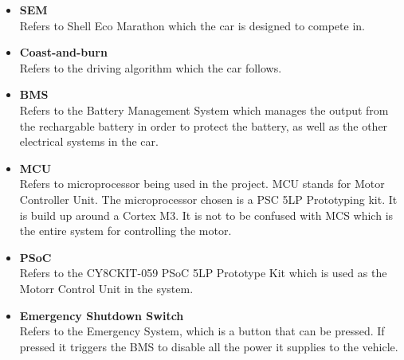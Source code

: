 \begin{itemize}
	\item \textbf{SEM}\\
	Refers to Shell Eco Marathon which the car is designed to compete in.
	\item \textbf{Coast-and-burn}\\
	Refers to the driving algorithm which the car follows.
	\item \textbf{BMS}\\
	Refers to the Battery Management System which manages the output from the rechargable battery in order to protect the battery, as well as the other electrical systems in the car.
	\item \textbf{MCU}\\
	Refers to microprocessor being used in the project. MCU stands for Motor Controller Unit. The microprocessor chosen is a PSC 5LP Prototyping kit. It is build up around a Cortex M3. It is not to be confused with MCS which is the entire system for controlling the motor. 
	\item \textbf{PSoC}\\
	Refers to the CY8CKIT-059 PSoC 5LP Prototype Kit which is used as the Motorr Control Unit in the system.
	\item \textbf{Emergency Shutdown Switch}\\
	Refers to the Emergency System, which is a button that can be pressed. If pressed it triggers the BMS to disable all the power it supplies to the vehicle.
\end{itemize}